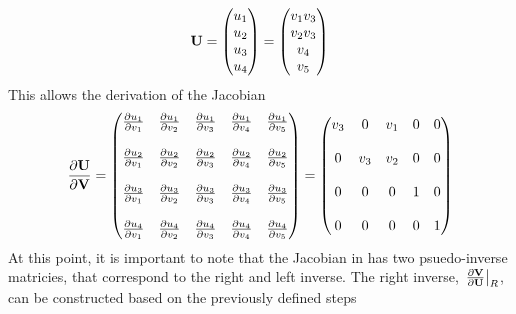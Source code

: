 \begin{equation}
  \mathbf U = \begin{pmatrix}
    u_1 \\
    u_2 \\
    u_3 \\
    u_4
  \end{pmatrix}
  =
  \begin{pmatrix}
    v_1 v_3 \\
    v_2 v_3 \\
    v_4 \\
    v_5
  \end{pmatrix}
  \label{u-to-v}
\end{equation}
This allows the derivation of the Jacobian 
\begin{equation}
  \frac{\partial \mathbf U}{\partial \mathbf V} = 
  \begin{pmatrix}
    \frac{\partial u_1}{\partial v_1} & \frac{\partial u_1}{\partial v_2} & \frac{\partial u_1}{\partial v_3} & \frac{\partial u_1}{\partial v_4} & \frac{\partial u_1}{\partial v_5} \\ \\
    \frac{\partial u_2}{\partial v_1} & \frac{\partial u_2}{\partial v_2} & \frac{\partial u_2}{\partial v_3} & \frac{\partial u_2}{\partial v_4} & \frac{\partial u_2}{\partial v_5} \\ \\
    \frac{\partial u_3}{\partial v_1} & \frac{\partial u_3}{\partial v_2} & \frac{\partial u_3}{\partial v_3} & \frac{\partial u_3}{\partial v_4} & \frac{\partial u_3}{\partial v_5} \\ \\
    \frac{\partial u_4}{\partial v_1} & \frac{\partial u_4}{\partial v_2} & \frac{\partial u_4}{\partial v_3} & \frac{\partial u_4}{\partial v_4} & \frac{\partial u_4}{\partial v_5}
  \end{pmatrix}
  =
  \begin{pmatrix}
    v_3 & 0   & v_1 & 0 & 0 \\ \\
    0   & v_3 & v_2 & 0 & 0 \\ \\
    0   & 0   & 0   & 1 & 0 \\ \\
    0   & 0   & 0   & 0 & 1
  \end{pmatrix}
  \label{dudv-jac}
\end{equation}
At this point, it is important to note that the Jacobian in  has
two psuedo-inverse matricies, that correspond to the right and left inverse.
The right inverse, $\left. \frac{\partial \mathbf V}{\partial \mathbf U}\right|_{R}$, can be constructed based on the previously
defined steps
